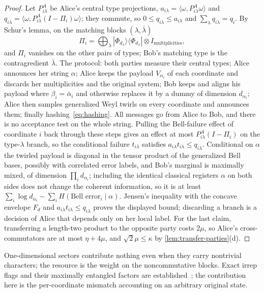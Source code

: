 \begin{proof}
Let $P^A_{i\lambda}$ be Alice's central type projections, $a_{i\lambda}=\langle\omega,P^A_{i\lambda}\omega\rangle$ and
$q_{i\lambda}=\langle\omega,P^A_{i\lambda}(I-\Pi_i)\omega\rangle$; they commute, so $0\le q_{i\lambda}\le a_{i\lambda}$ and
$\sum_\lambda q_{i\lambda}=q_i$. By Schur's lemma, on the matching blocks $(\lambda,\bar\lambda)$
\[
\Pi_i=\bigoplus_\lambda|\Phi_{d_\lambda}\rangle\langle\Phi_{d_\lambda}|\otimes I_{\text{multiplicities}},
\]
and $\Pi_i$ vanishes on the other pairs of types; Bob's matching type is the contragredient $\bar\lambda$. The protocol:
both parties measure their central types; Alice announces her string $\alpha$; Alice keeps the payload $V_{\alpha_i}$ of
each coordinate and discards her multiplicities and the original system; Bob keeps and aligns his payload where
$\beta_i=\bar\alpha_i$ and otherwise replaces it by a dummy of dimension $d_{\alpha_i}$; Alice then samples generalized
Weyl twirls on every coordinate and announces them; finally hashing~\eqref{eq:hashing}. All messages go from Alice to Bob,
and there is no acceptance test on the whole string. Pulling the Bell-failure effect of coordinate $i$ back through these
steps gives an effect at most $P^A_{i\lambda}(I-\Pi_i)$ on the type-$\lambda$ branch, so the conditional failure
$t_{i\lambda}$ satisfies $a_{i\lambda}t_{i\lambda}\le q_{i\lambda}$. Conditional on $\alpha$ the twirled payload is diagonal in
the tensor product of the generalized Bell bases, possibly with correlated error labels, and Bob's marginal is maximally mixed,
of dimension $\prod_id_{\alpha_i}$; including the identical classical
registers $\alpha$ on both sides does not change the coherent information, so it is at least
$\sum_i\log d_{\alpha_i}-\sum_iH(\text{Bell error}_i\mid\alpha)$. Jensen's inequality with the concave envelope $F_d$ and
$a_{i\lambda}t_{i\lambda}\le q_{i\lambda}$ proves the displayed bound; discarding a branch is a decision of Alice that
depends only on her local label. For the last claim, transferring a length-two product to the opposite party costs
$2\mu$, so Alice's cross-commutators are at most $\eta+4\mu$, and $\sqrt2\mu\le\kappa$ by \cref{lem:transfer-parties}(d).
\end{proof}

One-dimensional sectors contribute nothing even when they carry nontrivial characters; the resource is the weight on the
noncommutative blocks. Exact irrep flags and their maximally entangled factors are established~\cite{MLWHS24,HM02}; the
contribution here is the per-coordinate mismatch accounting on an arbitrary original state.

